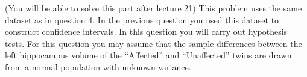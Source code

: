 \documentclass[addpoints,12pt]{exam}\usepackage[]{graphicx}\usepackage[]{color}
\begin{document}
\begin{questions}


\question (You will be able to solve this part after lecture 21) This problem uses the same dataset as in question 4. In the previous question you used this dataset to construct confidence intervals. In this question you will carry out hypothesis tests. For this question you may assume that the sample differences between the left hippocampus volume of the ``Affected'' and ``Unaffected'' twins are drawn from a normal population with unknown variance.
	\begin{parts}

\end{parts}
\end{questions}
\end{document}
